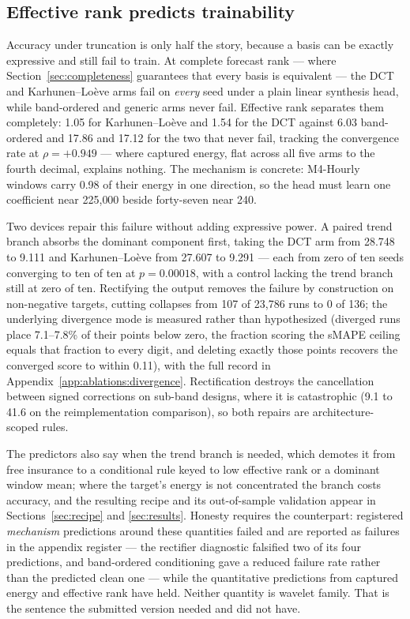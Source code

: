 \subsection{Effective rank predicts trainability}
\label{sec:predictors:effrank}

Accuracy under truncation is only half the story, because a basis can be
exactly expressive and still fail to train. At complete forecast rank ---
where Section~\ref{sec:completeness} guarantees that every basis is
equivalent --- the DCT and Karhunen--Lo\`eve arms fail on \emph{every}
seed under a plain linear synthesis head, while band-ordered and generic
arms never fail. Effective rank separates them completely:
1.05 for Karhunen--Lo\`eve and 1.54 for the DCT against 6.03
band-ordered and 17.86 and 17.12 for the two that never fail, tracking
the convergence rate at $\rho = +0.949$ --- where captured energy, flat
across all five arms to the fourth decimal, explains nothing. The
mechanism is concrete: M4-Hourly windows carry 0.98 of their energy in one
direction, so the head must learn one coefficient near 225{,}000 beside
forty-seven near 240.

Two devices repair this failure without adding expressive power. A paired
trend branch absorbs the dominant component first, taking the DCT arm
from 28.748 to 9.111 and Karhunen--Lo\`eve from 27.607 to 9.291 --- each
from zero of ten seeds converging to ten of ten at $p = 0.00018$, with a
control lacking the trend branch still at zero of ten. Rectifying the
output removes the failure by construction on non-negative targets,
cutting collapses from 107 of 23{,}786 runs to 0 of 136; the underlying
divergence mode is measured rather than hypothesized (diverged runs place
7.1--7.8\% of their points below zero, the fraction scoring the sMAPE
ceiling equals that fraction to every digit, and deleting exactly those
points recovers the converged score to within 0.11), with the full record
in Appendix~\ref{app:ablations:divergence}. Rectification destroys the
cancellation between signed corrections on sub-band designs, where it is
catastrophic (9.1 to 41.6 on the reimplementation comparison), so both
repairs are architecture-scoped rules.

The predictors also say when the trend branch is needed, which demotes it
from free insurance to a conditional rule keyed to low effective rank or
a dominant window mean; where the target's energy is not concentrated the
branch costs accuracy, and the resulting recipe and its out-of-sample
validation appear in Sections~\ref{sec:recipe} and \ref{sec:results}.
Honesty requires the counterpart: registered \emph{mechanism} predictions
around these quantities failed and are reported as failures in the
appendix register --- the rectifier diagnostic falsified two of its four
predictions, and band-ordered conditioning gave a reduced failure rate
rather than the predicted clean one --- while the quantitative predictions
from captured energy and effective rank have held. Neither quantity is
wavelet family. That is the sentence the submitted version needed and did
not have.

